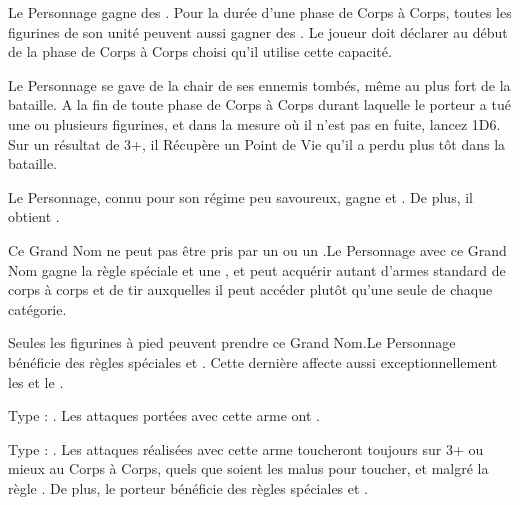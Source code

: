 \begin{multicols}{2}
Le Personnage gagne des \poisonedattacks{}. Pour la durée d'une phase de Corps à Corps, toutes les figurines de son unité peuvent aussi gagner des \poisonedattacks{}. Le joueur doit déclarer au début de la phase de Corps à Corps choisi qu'il utilise cette capacité.

Le Personnage se gave de la chair de ses ennemis tombés, même au plus fort de la bataille. A la fin de toute phase de Corps à Corps durant laquelle le porteur a tué une ou plusieurs figurines, et dans la mesure où il n'est pas en fuite, lancez 1D6. Sur un résultat de 3+, il Récupère un Point de Vie qu'il a perdu plus tôt dans la bataille.

Le Personnage, connu pour son régime peu savoureux, gagne  et \stupidity{}. De plus, il obtient .

Ce Grand Nom ne peut pas être pris par un \wizard{} ou un \mammothhunter{}.\newline Le Personnage avec ce Grand Nom gagne la règle spéciale \weaponmaster{} et une \platearmour{}, et peut acquérir autant d'armes standard de corps à corps et de tir auxquelles il peut accéder plutôt qu'une seule de chaque catégorie.

Seules les figurines à pied peuvent prendre ce Grand Nom.\newline Le Personnage bénéficie des règles spéciales \devastatingcharge{} et \thunderouscharge{}. Cette dernière affecte aussi exceptionnellement les \impacthits{} et le \stomp{}.

\endpricelistNSP
\end{multicols}

\closearmynewsection

\startarmymagicalitems

\armymagicalweapons

\startpricelist

Type : \gw{}. Les attaques portées avec cette arme ont .

Type : \ironfist{}. Les attaques réalisées avec cette arme toucheront toujours sur 3+ ou mieux au Corps à Corps, quels que soient les malus pour toucher, et malgré la règle \parry{}. De plus, le porteur bénéficie des règles spéciales  et .


